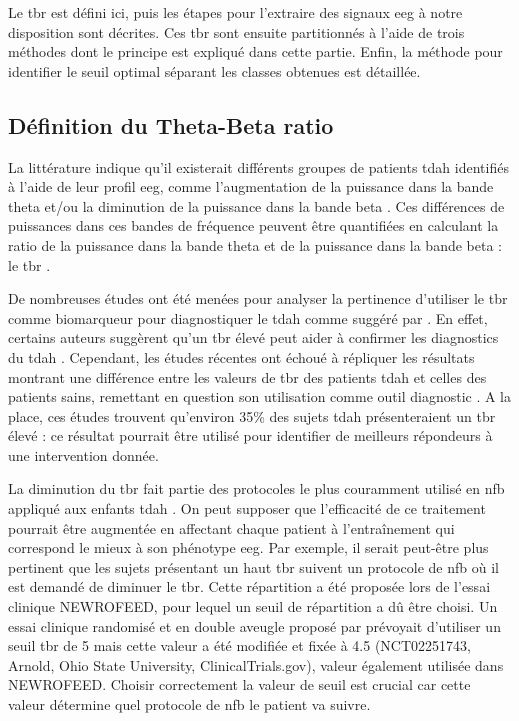Le \gls{tbr} est défini ici, puis les étapes pour l'extraire des
signaux \gls{eeg} à notre disposition sont décrites. Ces \gls{tbr} sont ensuite partitionnés à l'aide de trois méthodes dont le principe est expliqué dans cette partie. 
Enfin, la méthode pour identifier le seuil optimal séparant les classes obtenues est détaillée.

\subsection{Définition du Theta-Beta ratio}
La littérature indique qu'il existerait différents groupes de patients \gls{tdah} identifiés à l'aide de leur profil \gls{eeg}, comme l'augmentation
de la puissance dans la bande theta et/ou la diminution de la puissance dans la bande beta \citep{Clarke2011, Loo2018}. Ces différences de puissances dans ces 
bandes de fréquence peuvent être quantifiées en calculant la ratio de la puissance dans la bande theta et de la puissance dans la bande beta : le 
\gls{tbr} \citep{Arns2013}. 

De nombreuses études ont été menées pour analyser la pertinence d'utiliser le \gls{tbr} comme biomarqueur pour diagnostiquer le \gls{tdah} comme suggéré par \citet{Lubar1991}. 
En effet, certains auteurs suggèrent qu'un \gls{tbr}
élevé peut aider à confirmer les diagnostics du \gls{tdah} \citep{NebaHealth, Saad2018, FDA}. Cependant, les études récentes ont échoué à répliquer les résultats
montrant une différence entre les valeurs de \gls{tbr} des patients \gls{tdah} et celles des patients sains, remettant en question son utilisation comme outil 
diagnostic \citep{Zhang2017, Arns2013, Clarke2001, VanDoren2017}. A la place, ces études trouvent qu'environ 35\% des sujets \gls{tdah} présenteraient un \gls{tbr} élevé : ce
résultat pourrait être utilisé pour identifier de meilleurs répondeurs à une intervention donnée. 

La diminution du \gls{tbr} fait partie des protocoles le plus couramment utilisé en \gls{nfb} appliqué aux enfants \gls{tdah} \citep{Arns2014}. 
On peut supposer que l'efficacité de ce traitement pourrait être augmentée en affectant chaque patient à l'entraînement qui correspond le mieux à son phénotype \gls{eeg}. 
Par exemple, il serait peut-être plus pertinent que les sujets présentant un haut \gls{tbr} suivent un protocole de \gls{nfb} où il est demandé de 
diminuer le \gls{tbr}. Cette répartition a été proposée lors de l'essai clinique NEWROFEED, pour lequel un seuil de répartition a dû être choisi. 
Un essai clinique randomisé et en double aveugle proposé par \citet{Kerson2013} prévoyait d'utiliser un seuil \gls{tbr} de 5 mais cette valeur a 
été modifiée et fixée à 4.5 (NCT02251743, Arnold, Ohio State University, ClinicalTrials.gov), valeur également
utilisée dans NEWROFEED. Choisir correctement la valeur de seuil est crucial car cette valeur détermine quel protocole de \gls{nfb} le patient va suivre. 

